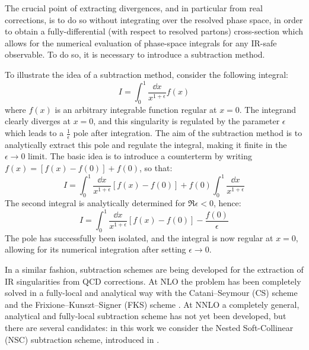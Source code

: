 The crucial point of extracting divergences, and in particular from real corrections, is to do so without integrating over the resolved phase space, in order to obtain a fully-differential (with respect to resolved partons) cross-section which allows for the numerical evaluation of phase-space integrals for any IR-safe observable. To do so, it is necessary to introduce a subtraction method.

To illustrate the idea of a subtraction method, consider the following integral:
\begin{equation}
  I = \int_0^1 \frac{\dd x}{x^{1 + \epsilon}} f(x)
\end{equation}
where $ f(x) $ is an arbitrary integrable function regular at $ x = 0 $. The integrand clearly diverges at $ x = 0 $, and this singularity is regulated by the parameter $ \epsilon $ which leads to a $ \frac{1}{\epsilon} $ pole after integration. The aim of the subtraction method is to analytically extract this pole and regulate the integral, making it finite in the $ \epsilon \rightarrow 0 $ limit. The basic idea is to introduce a counterterm by writing $ f(x) = [f(x) - f(0)] + f(0) $, so that:
\begin{equation*}
  I = \int_0^1 \frac{\dd x}{x^{1 + \epsilon}} \left[ f(x) - f(0) \right] + f(0) \int_0^1 \frac{\dd x}{x^{1 + \epsilon}}
\end{equation*}
The second integral is analytically determined for $ \Re{\epsilon} < 0 $, hence:
\begin{equation}
  I = \int_0^1 \frac{\dd x}{x^{1 + \epsilon}} \left[ f(x) - f(0) \right] - \frac{f(0)}{\epsilon}
\end{equation}
The pole has successfully been isolated, and the integral is now regular at $ x = 0 $, allowing for its numerical integration after setting $ \epsilon \rightarrow 0 $.

In a similar fashion, subtraction schemes are being developed for the extraction of IR singularities from QCD corrections. At NLO the problem has been completely solved in a fully-local and analytical way with the Catani--Seymour (CS) scheme \cite{Catani-1997} and the Frixione--Kunszt--Signer (FKS) scheme \cite{Frixione-1996, Frixione-1997}. At NNLO a completely general, analytical and fully-local subtraction scheme has not yet been developed, but there are several candidates: in this work we consider the Nested Soft-Collinear (NSC) subtraction scheme, introduced in \cite{rontsch-2017}.











